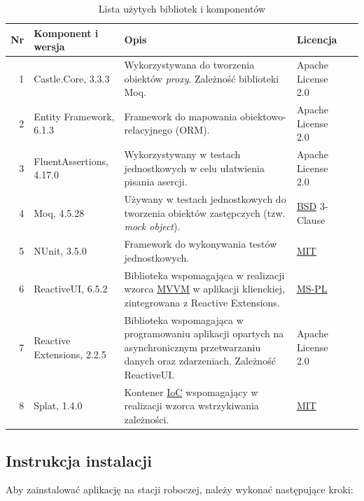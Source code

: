 \documentclass[10pt,a4paper]{article}
\begin{document}
\begin{table}[H]
	\begin{tabularx}{\textwidth}{|r|l|X|l|c|}
		\hline
		\textbf{Nr} & \textbf{Komponent i wersja} & \textbf{Opis} & \textbf{Licencja} & \\
		\hline
		1 & 
		Castle.Core, 3.3.3 &
		Wykorzystywana do tworzenia obiektów \textit{proxy}. Zależność biblioteki Moq. &
		Apache License 2.0 &
		\cite{castlecore} \\
		\hline
		2 &
		Entity Framework, 6.1.3 &
		Framework do mapowania obiektowo-relacyjnego (ORM). &
		Apache License 2.0 &
		\cite{entityframework} \\
		\hline
		3 &
		FluentAssertions, 4.17.0 &
		Wykorzystywany w testach jednostkowych w celu ułatwienia pisania asercji. &
		Apache License 2.0 &
		\cite{fluentassertions} \\
		\hline
		4 &
		Moq, 4.5.28 &
		Używany w testach jednostkowych do tworzenia obiektów zastępczych (tzw. \emph{mock object}). &
		\mbox{\hyperref[abbr:bsd]{BSD}} 3-Clause &
		\cite{moq} \\
		\hline
		5 &
		NUnit, 3.5.0 &
		Framework do wykonywania testów jednostkowych. &
		\mbox{\hyperref[abbr:mit]{MIT}} &
		\cite{nunit} \\
		\hline
		6 &
		ReactiveUI, 6.5.2 &
		Biblioteka wspomagająca w realizacji wzorca \hyperref[abbr:mvvm]{MVVM} w aplikacji klienckiej, zintegrowana z Reactive Extensions. &
		\mbox{\hyperref[abbr:mspl]{MS-PL}} &
		\cite{reactiveui} \\
		\hline
		7 &
		Reactive Extensions, 2.2.5 &
		Biblioteka wspomagająca w programowaniu aplikacji opartych na asynchronicznym przetwarzaniu danych oraz zdarzeniach. Zależność ReactiveUI. &
		Apache License 2.0 &
		\cite{reactiveextensions} \\
		\hline
		8 &
		Splat, 1.4.0 &
		Kontener \hyperref[abbr:ioc]{IoC} wspomagający w realizacji wzorca wstrzykiwania zależności. &
		\mbox{\hyperref[abbr:mit]{MIT}} &
		\cite{splat} \\
		\hline
	\end{tabularx}
	\caption{Lista użytych bibliotek i komponentów}
\end{table}

\subsection{Instrukcja instalacji}
Aby zainstalować aplikację na stacji roboczej, należy wykonać następujące kroki:
\end{document}
